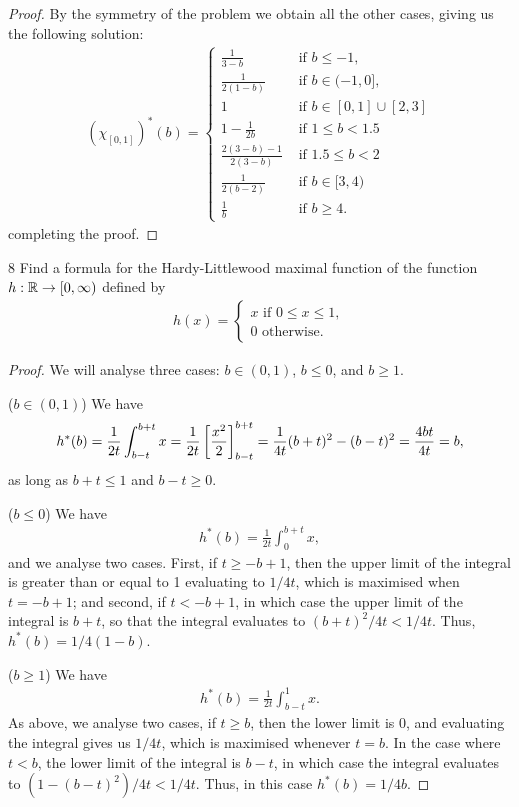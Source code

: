 \begin{proof}
By the symmetry of the problem we obtain all the other cases, giving us the following solution:
\begin{align*}
    (\chi_{[0,1]})^\ast(b) =
    \begin{cases}
        \frac{1}{3-b}    &\text{ if } b \leq -1,\\
        \frac{1}{2(1-b)} &\text{ if } b \in (-1, 0],\\
        1                &\text{ if } b \in [0,1] \cup [2,3]\\
        1 - \frac{1}{2b} &\text{ if } 1 \leq b < 1.5\\
        \frac{2(3-b) - 1}{2(3-b)} &\text{ if } 1.5 \leq b < 2\\
        \frac{1}{2(b-2)} &\text{ if } b \in [3, 4)\\
        \frac{1}{b}      &\text{ if } b \geq 4.
    \end{cases}
\end{align*}
completing the proof.
\end{proof} 

\begin{exercise}{8}
Find a formula for the Hardy-Littlewood maximal function of the function $h: \mathbb{R} \to [0, \infty)$ defined by 
\begin{align*}
    h(x)
    = 
    \begin{cases}
        x \text{ if } 0 \leq x \leq 1,\\
        0 \text{ otherwise}.
    \end{cases}
\end{align*}
\end{exercise}
\begin{proof}
We will analyse three cases:
$b \in (0, 1)$, $b \leq 0$, and $b \geq 1$.

($b \in (0, 1)$)
We have
\begin{align*}
    h^\ast(b)
    = \frac{1}{2t} \int_{b - t}^{b + t} x 
    = \frac{1}{2t}\left[ \frac{x^2}{2}\right]_{b - t}^{b + t}
    = \frac{1}{4t}(b + t)^2 - (b - t)^2 
    = \frac{4bt}{4t}
    = b,
\end{align*}
as long as $b + t \leq 1$ and $b - t \geq 0$.

($b \leq 0$)
We have
\begin{align*}
    h^\ast(b)
    = \frac{1}{2t} \int_{0}^{b + t} x,
\end{align*}
and we analyse two cases.
First, if $t \geq -b + 1$, then the upper limit of the integral is greater than or equal to 1 evaluating to $1/4t$, which is maximised when $t = -b + 1$;
and second, if $t < -b + 1$, in which case the upper limit of the integral is $b+t$, so that the integral evaluates to $(b + t)^2/4t < 1/4t$.
Thus, $h^\ast(b) = 1/4(1-b)$.

($b \geq 1$)
We have
\begin{align*}
    h^\ast(b)
    = \frac{1}{2t} \int_{b - t}^{1} x.
\end{align*}
As above, we analyse two cases, if $t \geq b$, then the lower limit is 0, and evaluating the integral gives us $1/4t$, which is maximised whenever $t = b$.
In the case where $t < b$, the lower limit of the integral is $b - t$, in which case the integral evaluates to $(1-(b-t)^2)/4t < 1/4t$.
Thus, in this case $h^\ast(b) = 1/4b$.
\end{proof} 

